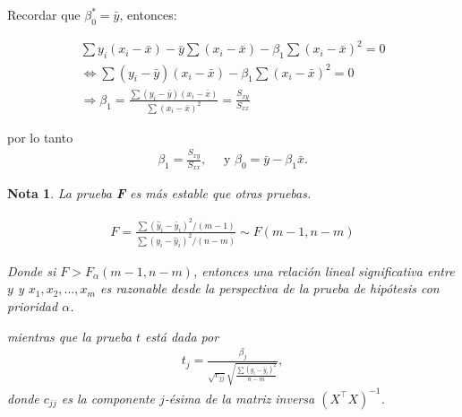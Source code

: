 \documentclass[12pt]{article}
\newtheorem{Note}{Nota}%
\begin{document}
Recordar que $\beta_0^* = \bar{y}$, entonces:

\begin{eqnarray*}
\sum y_i (x_i - \bar{x}) - \bar{y} \sum (x_i - \bar{x}) - \beta_1 \sum (x_i - \bar{x})^2 = 0\\
\Leftrightarrow \sum (y_i - \bar{y})(x_i - \bar{x}) - \beta_1 \sum (x_i - \bar{x})^2 = 0\\
\Rightarrow \beta_1 = \frac{\sum (y_i - \bar{y})(x_i - \bar{x})}{\sum (x_i - \bar{x})^2} = \frac{S_{xy}}{S_{xx}}
\end{eqnarray*}

por lo tanto
\begin{eqnarray*}
\boxed{ \beta_1 = \frac{S_{xy}}{S_{xx}}, } \quad \textrm{ y }\boxed{ \beta_0 = \bar{y} - \beta_1 \bar{x}.}
\end{eqnarray*}


\begin{Note}

La prueba \textbf{F} es más estable que otras pruebas.

\begin{eqnarray}
F = \frac{\sum (\hat{y}_i - \bar{y}_i)^2 / (m - 1)}{\sum (y_i - \hat{y}_i)^2 / (n - m)} \sim F(m - 1, n - m)
\end{eqnarray}

Donde si $F > F_\alpha(m - 1, n - m)$, entonces una relación lineal significativa entre $y$ y $x_1, x_2, \dots, x_m$ es razonable desde la perspectiva de la prueba de hipótesis con prioridad $ \alpha$.

mientras que la prueba $t$ est\'a dada por
\begin{eqnarray}
t_j = \frac{\beta_j}{\sqrt{c_{jj}} \sqrt{ \frac{\sum (y_i - \hat{y}_i)^2}{n - m} }},
\end{eqnarray}
donde \( c_{jj} \) es la componente \( j \)-ésima de la matriz inversa \( (X^\top X)^{-1} \).
\end{Note}
\end{document}
